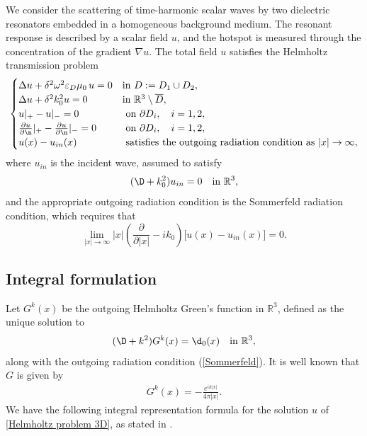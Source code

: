\documentclass[10pt]{article}
\numberwithin{equation}{section}
\begin{document}
We consider the scattering of time-harmonic scalar waves by two dielectric resonators embedded in a homogeneous background medium. The resonant response is described by a scalar field $u$, and the hotspot is measured through the concentration of the gradient $\nabla u$. The total field $u$ satisfies the Helmholtz transmission problem
\begin{align}\label{Helmholtz problem 3D}
    \begin{cases}
    \Delta u + \delta^2 \omega^2 \varepsilon_D\mu_0\, u = 0 & \text{in } D := D_1 \cup D_2, \\
    \Delta u + \delta^2 k_0^2 u = 0 & \text{in } \mathbb{R}^3 \setminus \overline{D},\\
    u|_+ - u|_-=0 &\text{ on } \partial D_i, \quad i=1,2, \\
    \frac{\partial u}{\partial \n}|_+ - \frac{\partial u}{\partial \n}|_- = 0 &\text{ on } \partial D_i, \quad i=1,2, \\
    u(x) - u_{in}(x) &\text{ satisfies the outgoing radiation condition as } |x|\to \infty,\\
    \end{cases}
\end{align}
where $u_{in}$ is the incident wave, assumed to satisfy
\begin{align*}
    (\D + k_0^2)u_{in}=0 \ \ \text{ in } \mathbb{R}^3,
\end{align*}
and the appropriate outgoing radiation condition is the Sommerfeld radiation condition, which requires that
\begin{equation}\label{Sommerfeld}
    \lim_{|x|\to\infty} |x|
    \left( \frac{\partial}{\partial |x|} - i k_0 \right)\Big[u(x) - u_{in}(x)\Big]=0.
\end{equation}




\subsection{Integral formulation}



Let $G^k(x)$ be the outgoing Helmholtz Green's function in $\mathbb{R}^3$, defined as the unique solution to
\begin{align*}
    (\D + k^2) G^k(x) = \d_0(x) \ \ \text{ in } \mathbb{R}^3,
\end{align*}
along with the outgoing radiation condition (\ref{Sommerfeld}). It is well known that $G$ is given by
\begin{align}
    G^k(x)= -\frac{e^{ik|x|}}{4\pi|x|}.
\end{align}
We have the following integral representation formula for the solution $u$ of \eqref{Helmholtz problem 3D}, as stated in \cite{AD}.
\end{document}
